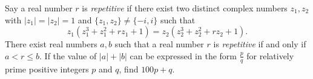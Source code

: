 Say a real number $r$ is \emph{repetitive} if there exist two distinct complex numbers $z_1,z_2$ with $|z_1|=|z_2|=1$ and $\{z_1,z_2\}\neq\{-i,i\}$ such that 
\[
z_1(z_1^3+z_1^2+rz_1+1)=z_2(z_2^3+z_2^2+rz_2+1).
\]
There exist real numbers $a,b$ such that a real number $r$ is \emph{repetitive} if and only if $a < r\le b$. If the value of $|a|+|b|$ can be expressed in the form $\frac{p}{q}$ for relatively prime positive integers $p$ and $q$, find $100p+q$.
